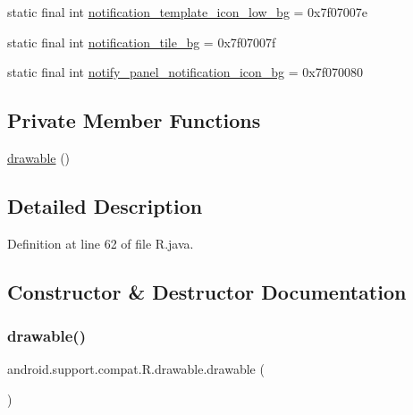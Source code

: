 \begin{DoxyCompactItemize}
\item 
static final int \mbox{\hyperlink{classandroid_1_1support_1_1compat_1_1_r_1_1drawable_a0b6c638ec19c3a21b0f3b82ab4af62fe}{notification\+\_\+template\+\_\+icon\+\_\+low\+\_\+bg}} = 0x7f07007e
\item 
static final int \mbox{\hyperlink{classandroid_1_1support_1_1compat_1_1_r_1_1drawable_a6ab5153e2c67f18967cc5d392013321d}{notification\+\_\+tile\+\_\+bg}} = 0x7f07007f
\item 
static final int \mbox{\hyperlink{classandroid_1_1support_1_1compat_1_1_r_1_1drawable_ac2f70454d50b1ec6c8a6a761a78edcb2}{notify\+\_\+panel\+\_\+notification\+\_\+icon\+\_\+bg}} = 0x7f070080
\end{DoxyCompactItemize}
\subsection*{Private Member Functions}
\begin{DoxyCompactItemize}
\item 
\mbox{\hyperlink{classandroid_1_1support_1_1compat_1_1_r_1_1drawable_af5b05cd39773159b0fccd1da4d478004}{drawable}} ()
\end{DoxyCompactItemize}


\subsection{Detailed Description}


Definition at line 62 of file R.\+java.



\subsection{Constructor \& Destructor Documentation}
\mbox{\label{classandroid_1_1support_1_1compat_1_1_r_1_1drawable_af5b05cd39773159b0fccd1da4d478004}} 
\subsubsection{\texorpdfstring{drawable()}{drawable()}}
{\footnotesize\ttfamily android.\+support.\+compat.\+R.\+drawable.\+drawable (\begin{DoxyParamCaption}{ }\end{DoxyParamCaption})\hspace{0.3cm}{\ttfamily [private]}}



